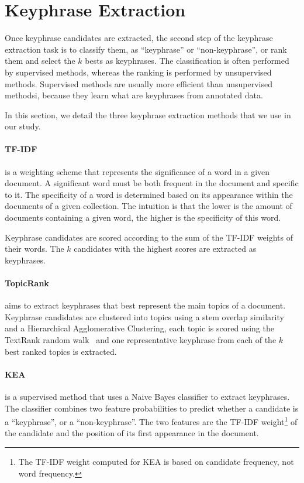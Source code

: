\section{Keyphrase Extraction}
\label{sec:keyphrase_extraction}
  Once keyphrase candidates are extracted, the second step of the keyphrase
  extraction task is to classify them, as ``keyphrase'' or ``non-keyphrase'', or
  rank them and select the $k$ bests as keyphrases. The classification is often
  performed by supervised methods, whereas the ranking is performed by
  unsupervised methods. Supervised methods are usually more efficient than
  unsupervised methodsi, because they learn what are keyphrases from annotated
  data.

  In this section, we detail the three keyphrase extraction methods that we use
  in our study.

  \paragraph{TF-IDF~\textnormal{\cite{jones1972tfidf}}} is a weighting scheme
  that represents the significance of a word in a given document. A significant
  word must be both frequent in the document and specific to it. The specificity
  of a word is determined based on its appearance within the documents of a
  given collection. The intuition is that the lower is the amount of documents
  containing a given word, the higher is the specificity of this word.

  Keyphrase candidates are scored according to the sum of the TF-IDF weights of
  their words. The $k$ candidates with the highest scores are extracted as
  keyphrases.

  \paragraph{TopicRank~\textnormal{\cite{bougouin2013topicrank}}} aims to
  extract keyphrases that best represent the main topics of a document.
  Keyphrase candidates are clustered into topics using a stem overlap similarity
  and a Hierarchical Agglomerative Clustering, each topic is scored using the
  TextRank random walk~\cite{mihalcea2004textrank} and one representative
  keyphrase from each of the $k$ best ranked topics is extracted.

  \paragraph{KEA~\textnormal{\cite{witten1999kea}}} is a supervised method that
  uses a Naive Bayes classifier to extract keyphrases. The classifier combines
  two feature probabilities to predict whether a candidate is a ``keyphrase'',
  or a ``non-keyphrase''. The two features are the TF-IDF weight\footnote{The
  TF-IDF weight computed for KEA is based on candidate frequency, not word
  frequency.} of the candidate and the position of its first appearance in the
  document.

